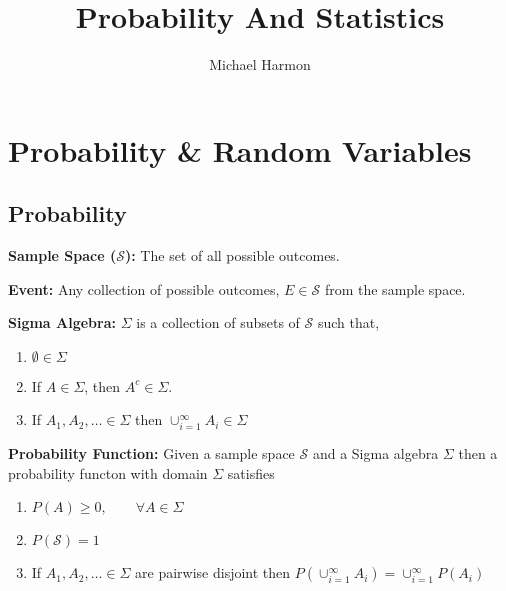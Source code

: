 \documentclass[10pt]{article}
\title{Probability And Statistics}
\author{Michael Harmon}
\numberwithin{equation}{section}
\begin{document}
\maketitle

\tableofcontents


\newpage

\section{Probability \& Random Variables}

\subsection{Probability}
\noindent
\textbf{Sample Space ($\mathcal{S}$): } The set of all possible outcomes.

\vspace{2mm}

\noindent
\textbf{Event:} Any collection of possible outcomes, $E \in \mathcal{S}$ from the sample space.

\vspace{2mm}

\noindent
\textbf{Sigma Algebra:}  $\Sigma$ is a  collection of subsets of $\mathcal{S}$ such that,

\begin{enumerate}
\item $\emptyset \in \Sigma$
\item If $A \in \Sigma$, then $A^{c} \in \Sigma$.
\item If $A_{1}, A_{2}, \ldots \in \Sigma$ then $\cup_{i=1}^{\infty} A_{i} \in \Sigma$
\end{enumerate}


\vspace{2mm}

\noindent
\textbf{Probability Function:}  Given a sample space $\mathcal{S}$ and a Sigma algebra $\Sigma$ then a probability functon with domain $\Sigma$ satisfies

\begin{enumerate}
\item $P(A) \geq 0, \qquad \forall A \in \Sigma$
\item $P(\mathcal{S}) = 1$
\item If $A_{1}, A_{2}, \ldots  \in \Sigma$ are pairwise disjoint then $P(\cup_{i=1}^{\infty} A_{i}) = \cup_{i=1}^{\infty} P(A_{i})$
\end{enumerate}

\vspace{2mm}
\end{document}

